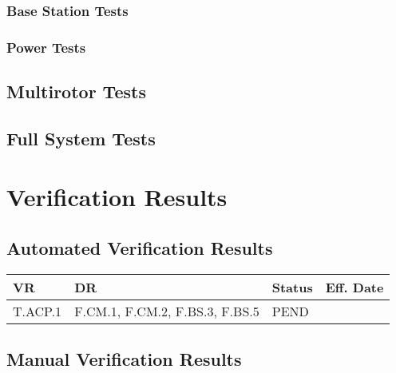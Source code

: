 \documentclass[10pt,letterpaper]{article}
\begin{document}
\subsubsection{Base Station Tests}


\subsubsection{Power Tests}


\subsection{Multirotor Tests}


\subsection{Full System Tests}


\section{Verification Results} \label{results}

\subsection{Automated Verification Results}
\begin{table}[H]
	\centering
	\begin{tabular}{llll}
	\hline
	\textbf{VR} & \textbf{DR} & \textbf{Status} & \textbf{Eff. Date} \\
	\hline
	T.ACP.1 & F.CM.1, F.CM.2, F.BS.3, F.BS.5 & PEND   & \\
	\hline
	\end{tabular}
\end{table}

\subsection{Manual Verification Results}
\end{document}
